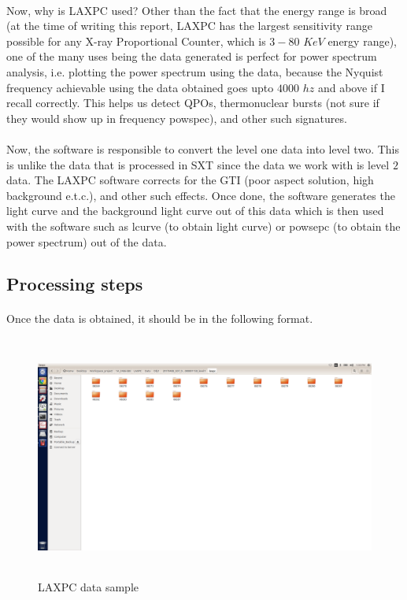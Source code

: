 \documentclass[a4paper,twoside]{report}
\numberwithin{equation}{section}
\begin{document}
\paragraph{}
Now, why is LAXPC used? Other than the fact that the energy range is broad (at the time of writing this report, LAXPC has the largest sensitivity range possible for any X-ray Proportional Counter, which is $3-80$ $KeV$ energy range), one of the many uses being the data generated is perfect for power spectrum analysis, i.e. plotting the power spectrum using the data, because the Nyquist frequency achievable using the data obtained goes upto $4000$ $hz$ and above if I recall correctly. This helps us detect QPOs, thermonuclear bursts (not sure if they would show up in frequency powspec), and other such signatures. 
\paragraph{}
Now, the software is responsible to convert the level one data into level two. This is unlike the data that is processed in SXT since the data we work with is level $2$ data. The LAXPC software corrects for the GTI (poor aspect solution, high background e.t.c.), and other such effects. Once done, the software generates the light curve and the background light curve out of this data which is then used with the software such as lcurve (to obtain light curve) or powsepc (to obtain the power spectrum) out of the data. 
\subsection{Processing steps}
\paragraph{}
Once the data is obtained, it should be in the following format. 
\begin{figure}[h]
\includegraphics[width=1.0\linewidth, height=8cm]{Screenshot_from_018-02-03_13-36-32.png}
\caption{LAXPC data sample}
\label{LAXPC_data_sample}
\end{figure}
\end{document}
